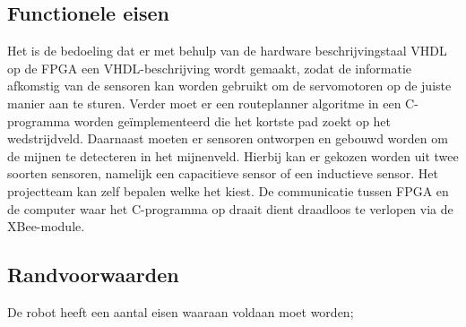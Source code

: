 \documentclass{report}
\begin{document}
\subsection{Functionele eisen}

Het is de bedoeling dat er met behulp van de hardware beschrijvingstaal VHDL op de FPGA een VHDL-beschrijving wordt gemaakt, zodat de informatie afkomstig van de sensoren kan worden gebruikt om de servomotoren op de juiste manier aan te sturen. Verder moet er een routeplanner algoritme in een C-programma worden geïmplementeerd die het kortste pad zoekt op het wedstrijdveld. Daarnaast moeten er sensoren ontworpen en gebouwd worden om de mijnen te detecteren in het mijnenveld. Hierbij kan er gekozen worden uit twee soorten sensoren, namelijk een capacitieve sensor of een inductieve sensor. Het projectteam kan zelf bepalen welke het kiest. 
\newline
De communicatie tussen FPGA en de computer waar het C-programma op draait dient draadloos te verlopen via de XBee-module.

\subsection{Randvoorwaarden}

De robot heeft een aantal eisen waaraan voldaan moet worden;
\end{document}
